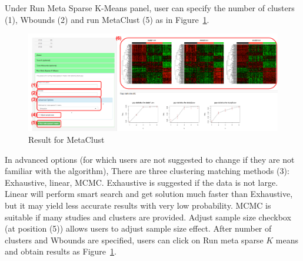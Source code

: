 \begin{steps}
Under Run Meta Sparse K-Means panel,
user can specify the number of clusters {\color{red} (1)}, Wbounds {\color{red} (2)} and run MetaClust {\color{red} (5)} 
as in Figure~\ref{fig:mskmRes}.
\begin{figure}[H]
\begin{center}
\includegraphics[scale=0.5]{./figure/metaClust/mskmRes.pdf}
\caption{Result for MetaClust}
\label{fig:mskmRes}
\end{center}
\end{figure}
In advanced options (for which users are not suggested to change if they are not familiar with the algorithm), 
There are three clustering matching methods {\color{red} (3)}: Exhaustive, linear, MCMC.
Exhaustive is suggested if the data is not large.
Linear will perform smart search and get solution much faster than Exhaustive, 
but it may yield less accurate results with very low probability.
MCMC is suitable if many studies and clusters are provided.
Adjust sample size checkbox (at position {\color{red} (5)}) allows users to adjust sample size effect.
After number of clusters and Wbounds are specified,
users can click on Run meta sparse $K$ means and obtain results as Figure~\ref{fig:mskmRes}.

\end{steps}

